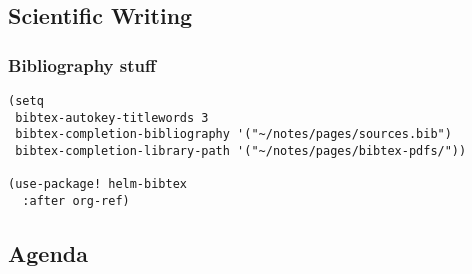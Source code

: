 \documentclass[11pt]{article}
\begin{document}
\subsection{Scientific Writing}
\label{sec:org709cfe8}

\subsubsection{Bibliography stuff}
\label{sec:org954e83e}
\begin{verbatim}
(setq
 bibtex-autokey-titlewords 3
 bibtex-completion-bibliography '("~/notes/pages/sources.bib")
 bibtex-completion-library-path '("~/notes/pages/bibtex-pdfs/"))

(use-package! helm-bibtex
  :after org-ref)
\end{verbatim}

\subsection{Agenda}
\label{sec:orgbb92afe}
\end{document}
